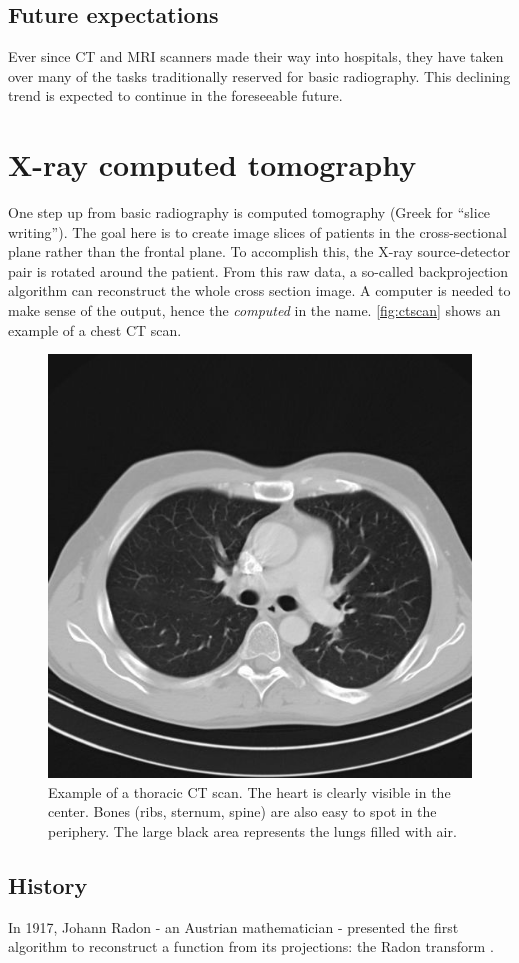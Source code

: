 \subsection{Future expectations}
Ever since CT and MRI scanners made their way into hospitals, they have taken
over many of the tasks traditionally reserved for basic radiography. This
declining trend is expected to continue in the foreseeable future.

\section{X-ray computed tomography}
One step up from basic radiography is computed tomography (Greek for ``slice
writing''). The goal here is to create image slices of patients in the
cross-sectional plane rather than the frontal plane. To accomplish this, the X-ray
source-detector pair is rotated around the patient. From this raw data, a
so-called backprojection algorithm can reconstruct the whole cross section
image. A computer is needed to make sense of the output, hence the
\emph{computed} in the name. \autoref{fig:ctscan} shows an example of a chest
CT scan.

\begin{figure}[ht]
\begin{center}
  \includegraphics[width=0.4\linewidth]{img/ct-thorax.jpg}
  \caption{Example of a thoracic CT scan. The heart is clearly visible in the
  center. Bones (ribs, sternum, spine) are also easy to spot in the periphery.
  The large black area represents the lungs filled with air.}
  \label{fig:ctscan}
\end{center}
\end{figure}

\subsection{History}
In 1917, Johann Radon - an Austrian mathematician - presented the first
algorithm to reconstruct a function from its projections: the Radon transform
\cite{radon}.

